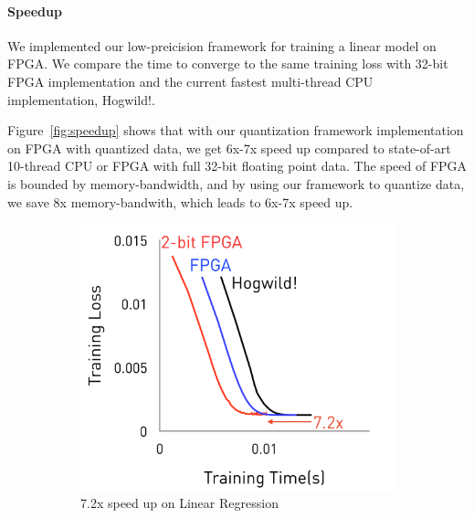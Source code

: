 \documentclass{article}
\begin{document}
\paragraph{Speedup}
We implemented our low-preicision framework for training a linear model on FPGA. We compare the time to converge to the same training loss with 32-bit FPGA implementation and the current fastest multi-thread CPU implementation, Hogwild!.

Figure~\ref{fig:speedup} shows that with our quantization framework
implementation on FPGA with quantized data, 
we get 6x-7x speed up compared to state-of-art
10-thread CPU or FPGA with full 32-bit floating point data. The speed of FPGA is bounded by memory-bandwidth, and by using our framework to quantize data, we save 8x memory-bandwith, which leads to 6x-7x speed up.
\begin{figure}[h]
\centering
    \begin{subfigure}[h]{.4\columnwidth}
    \includegraphics[width=\columnwidth]{final-experiments/SpeedUp-LR} 
    \caption{7.2x speed up on Linear Regression}
    \end{subfigure}
    \begin{subfigure}[h]{.4\columnwidth}

\end{subfigure}
\end{figure}
\end{document}
